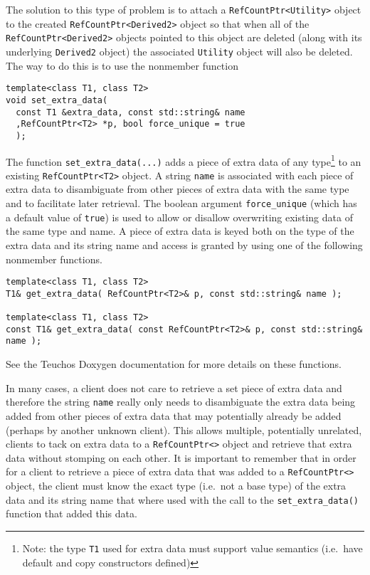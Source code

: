 The solution to this type of problem is to attach a
{}\texttt{RefCountPtr<Utility>} object to the created
{}\texttt{RefCountPtr<Derived2>} object so that when all of the
{}\texttt{RefCountPtr<Derived2>} objects pointed to this object are
deleted (along with its underlying {}\texttt{Derived2} object) the
associated {}\texttt{Utility} object will also be deleted.  The way to
do this is to use the nonmember function

{\scriptsize\begin{verbatim}
template<class T1, class T2>
void set_extra_data(
  const T1 &extra_data, const std::string& name
  ,RefCountPtr<T2> *p, bool force_unique = true
  );
\end{verbatim}}

The function {}\texttt{set\-\_extra\-\_data(...)} adds a piece of
extra data of any type\footnote{Note: the type {}\texttt{T1} used for
extra data must support value semantics (i.e.~have default and copy
constructors defined)} to an existing {}\texttt{RefCountPtr<T2>}
object.  A string \texttt{name} is associated with each piece of extra
data to disambiguate from other pieces of extra data with the same
type and to facilitate later retrieval.  The boolean argument
\texttt{force\-\_unique} (which has a default value of \texttt{true})
is used to allow or disallow overwriting existing data of the same
type and name.  A piece of extra data is keyed both on the type of the
extra data and its string name and access is granted by using one of
the following nonmember functions.

{\scriptsize\begin{verbatim}
template<class T1, class T2>
T1& get_extra_data( RefCountPtr<T2>& p, const std::string& name );

template<class T1, class T2>
const T1& get_extra_data( const RefCountPtr<T2>& p, const std::string& name );
\end{verbatim}}

{}\noindent{} See the Teuchos Doxygen documentation for more details
on these functions.

In many cases, a client does not care to retrieve a set piece of extra
data and therefore the string \texttt{name} really only needs to
disambiguate the extra data being added from other pieces of extra
data that may potentially already be added (perhaps by another unknown
client).  This allows multiple, potentially unrelated, clients to tack
on extra data to a {}\texttt{Ref\-Count\-Ptr<>} object and retrieve
that extra data without stomping on each other.  It is important to
remember that in order for a client to retrieve a piece of extra data
that was added to a {}\texttt{Ref\-Count\-Ptr<>} object, the client
must know the exact type (i.e.~not a base type) of the extra data and
its string name that where used with the call to the
{}\texttt{set\-\_extra\-\_data()} function that added this data.

